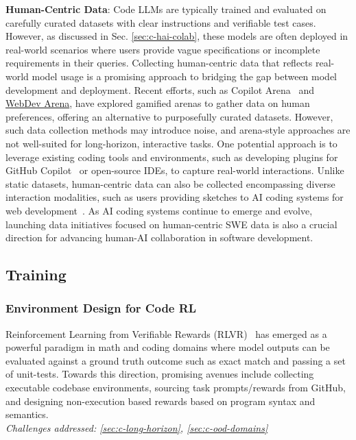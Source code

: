 \textbf{Human-Centric Data}:
Code LLMs are typically trained and evaluated on carefully curated datasets with clear instructions and verifiable test cases. However, as discussed in Sec. \ref{sec:c-hai-colab}, these models are often deployed in real-world scenarios where users provide vague specifications or incomplete requirements in their queries. Collecting human-centric data that reflects real-world model usage is a promising approach to bridging the gap between model development and deployment. Recent efforts, such as Copilot Arena~\citep{chi2025copilotarena} and \href{https://web.lmarena.ai/}{WebDev Arena}, have explored gamified arenas to gather data on human preferences, offering an alternative to purposefully curated datasets. However, such data collection methods may introduce noise, and arena-style approaches are not well-suited for long-horizon, interactive tasks. One potential approach is to leverage existing coding tools and environments, such as developing plugins for GitHub Copilot~\citep{bajpai2024let} or open-source IDEs, to capture real-world interactions. Unlike static datasets, human-centric data can also be collected encompassing diverse interaction modalities, such as users providing sketches to AI coding systems for web development~\citep{li2024sketch2code}. As AI coding systems continue to emerge and evolve, launching data initiatives focused on human-centric SWE data is also a crucial direction for advancing human-AI collaboration in software development.


\subsection{Training}

\subsubsection{Environment Design for Code RL} \label{sec:d-rl}
\begin{tcolorbox}[colback=lightorange, boxrule=0pt, arc=5pt, outer arc=5pt]
Reinforcement Learning from Verifiable Rewards (RLVR)~\citep{lambert2025tulu3pushingfrontiers} has emerged as a powerful paradigm in math and coding domains where model outputs can be evaluated against a ground truth outcome such as exact match and passing a set of unit-tests. Towards this direction, promising avenues include collecting executable codebase environments, sourcing task prompts/rewards from GitHub, and designing non-execution based rewards based on program syntax and semantics.
\newline \\
\textit{Challenges addressed: \ref{sec:c-long-horizon}, \ref{sec:c-ood-domains}}
\end{tcolorbox}

